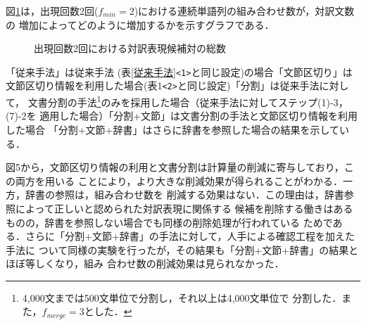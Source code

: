 図\ref{グラフ}は，出現回数2回($f_{min}=2$)における連続単語列の組み合わせ数が，対訳文数の
増加によってどのように増加するかを示すグラフである．


\begin{figure}[t]
  \begin{center}
    \epsfxsize=13cm 
  \end{center}
  \caption{出現回数2回における対訳表現候補対の総数}
  \label{グラフ}
\end{figure}

「従来手法」は従来手法 (表\ref{従来手法}\verb|<1>|と同じ設定)の場合「文節区切り」は
文節区切り情報を利用した場合(表1\verb|<2>|と同じ設定)「分割」は従来手法に対して，
文書分割の手法\footnote{4,000文までは500文単位で分割し，それ以上は4,000文単位で
分割した．また，$f_{merge}=3$とした．}のみを採用した場合（従来手法に対してステップ(1)-3，(7)-2を
適用した場合）「分割+文節」は文書分割の手法と文節区切り情報を利用した場合
「分割+文節+辞書」はさらに辞書を参照した場合の結果を示している．

図5から，文節区切り情報の利用と文書分割は計算量の削減に寄与しており，この両方を用いる
ことにより，より大きな削減効果が得られることがわかる．一方，辞書の参照は，組み合わせ数を
削減する効果はない．この理由は，辞書参照によって正しいと認められた対訳表現に関係する
候補を削除する働きはあるものの，辞書を参照しない場合でも同様の削除処理が行われている
ためである．さらに「分割+文節+辞書」の手法に対して，人手による確認工程を加えた手法に
ついて同様の実験を行ったが，その結果も「分割+文節+辞書」の結果とほぼ等しくなり，組み
合わせ数の削減効果は見られなかった． 


